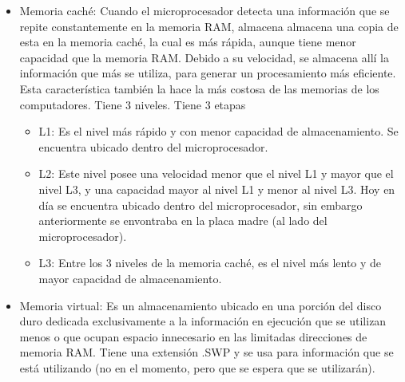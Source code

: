 \documentclass{article}
\begin{document}
\begin{itemize}
    \item Memoria caché:
    Cuando el microprocesador detecta una información que se repite constantemente en la memoria RAM, almacena almacena una copia de esta en la memoria caché, la cual es más rápida, aunque tiene menor capacidad que la memoria RAM. Debido a su velocidad, se almacena allí la información que más se utiliza, para generar un procesamiento más eficiente. Esta característica también la hace la más costosa de las memorias de los computadores. Tiene 3 niveles.
    Tiene 3 etapas 
    \begin{itemize}
        \item L1:
        Es el nivel más rápido y con menor capacidad de almacenamiento. Se encuentra ubicado dentro del microprocesador.
        \item L2: 
        Este nivel posee una velocidad menor que el nivel L1 y mayor que el nivel L3, y una capacidad mayor al nivel L1 y menor al nivel L3. Hoy en día se encuentra ubicado dentro del microprocesador, sin embargo anteriormente se envontraba en la placa madre (al lado del microprocesador).
        \item L3:
        Entre los 3 niveles de la memoria caché, es el nivel más lento y de mayor capacidad de almacenamiento.
    \end{itemize}
    


    \item Memoria virtual:
    Es un almacenamiento ubicado en una porción del disco duro dedicada exclusivamente a la información en ejecución que se utilizan menos o que ocupan espacio innecesario en las limitadas direcciones de memoria RAM.
    Tiene una extensión .SWP y se usa para información que se está utilizando (no en el momento, pero que se espera que se utilizarán).





\end{itemize}
\end{document}
